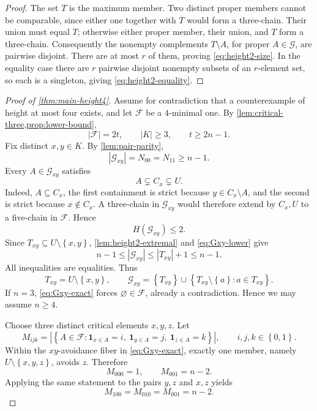 \documentclass[11pt,reqno]{amsart}
\numberwithin{equation}{section}
\theoremstyle{definition}
\theoremstyle{remark}
\newcommand{\F}{\mathcal{F}}
\newcommand{\G}{\mathcal{G}}
\newcommand{\1}{\mathbf{1}}
\newcommand{\set}[1]{\left\{#1\right\}}
\newcommand{\abs}[1]{\left|#1\right|}
\begin{document}
\begin{proof}
The set \(T\) is the maximum member.  Two distinct proper members cannot be comparable, since either one together with \(T\) would form a three-chain.  Their union must equal \(T\); otherwise either proper member, their union, and \(T\) form a three-chain.  Consequently the nonempty complements \(T\setminus A\), for proper \(A\in\G\), are pairwise disjoint.  There are at most \(r\) of them, proving \cref{eq:height2-size}.  In the equality case there are \(r\) pairwise disjoint nonempty subsets of an \(r\)-element set, so each is a singleton, giving \cref{eq:height2-equality}.
\end{proof}

\begin{proof}[Proof of \cref{thm:main-height4}]
Assume for contradiction that a counterexample of height at most four exists, and let \(\F\) be a \(4\)-minimal one.  By \cref{lem:critical-three,prop:lower-bound},
\begin{equation}\label{eq:h4-setup}
\abs{\F}=2t,
\qquad
\abs{K}\ge3,
\qquad
 t\ge2n-1.
\end{equation}
Fix distinct \(x,y\in K\).  By \cref{lem:pair-parity},
\begin{equation}\label{eq:Gxy-lower}
\abs{\G_{xy}}=N_{00}=N_{11}\ge n-1.
\end{equation}
Every \(A\in\G_{xy}\) satisfies
\[
A\subsetneq C_x\subsetneq U.
\]
Indeed, \(A\subseteq C_x\), the first containment is strict because \(y\in C_x\setminus A\), and the second is strict because \(x\notin C_x\).  A three-chain in \(\G_{xy}\) would therefore extend by \(C_x,U\) to a five-chain in \(\F\).  Hence
\begin{equation}\label{eq:Gxy-height2}
H(\G_{xy})\le2.
\end{equation}
Since \(T_{xy}\subseteq U\setminus\set{x,y}\), \cref{lem:height2-extremal} and \cref{eq:Gxy-lower} give
\[
n-1
\le \abs{\G_{xy}}
\le \abs{T_{xy}}+1
\le n-1.
\]
All inequalities are equalities.  Thus
\begin{equation}\label{eq:Gxy-exact}
T_{xy}=U\setminus\set{x,y},
\qquad
\G_{xy}
=
\set{T_{xy}}
\cup
\set{T_{xy}\setminus\set{a}:a\in T_{xy}}.
\end{equation}
If \(n=3\), \cref{eq:Gxy-exact} forces \(\varnothing\in\F\), already a contradiction.  Hence we may assume \(n\ge4\).

Choose three distinct critical elements \(x,y,z\).  Let
\[
M_{ijk}
=
\abs{\set{A\in\F:
\1_{x\in A}=i,\ \1_{y\in A}=j,\ \1_{z\in A}=k}},
\qquad i,j,k\in\set{0,1}.
\]
Within the \(xy\)-avoidance fiber in \cref{eq:Gxy-exact}, exactly one member, namely
\(
U\setminus\set{x,y,z}
\), avoids \(z\).  Therefore
\[
M_{000}=1,
\qquad
M_{001}=n-2.
\]
Applying the same statement to the pairs \(y,z\) and \(x,z\) yields
\begin{equation}\label{eq:lower-cube}
M_{100}=M_{010}=M_{001}=n-2.
\end{equation}


\end{proof}
\end{document}
